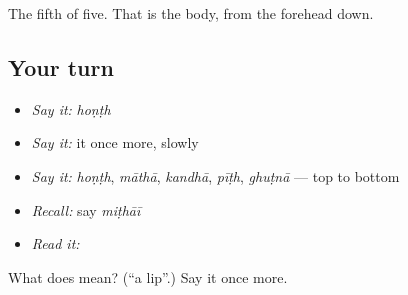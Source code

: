\begin{grammarlens}[title={What you've built}]
The fifth of five. That is the body, from the forehead down.
\end{grammarlens}

\subsection*{Your turn}
\begin{itemize}
\raggedright
  \item \emph{Say it:} \emph{hoṇṭh}
  \item \emph{Say it:} it once more, slowly
  \item \emph{Say it:} \emph{hoṇṭh}, \emph{māthā}, \emph{kandhā}, \emph{pīṭh}, \emph{ghuṭnā} — top to bottom
  \item \emph{Recall:} say \emph{miṭhāī}
  \item \emph{Read it:} \textbf{}
\end{itemize}

\begin{tcolorbox}[breakable,colback=teal!4,colframe=teal!35!black,title={Before you move on}]
What does  mean? (\textquotedblleft{}a lip\textquotedblright{}.) Say it once more.
\end{tcolorbox}
